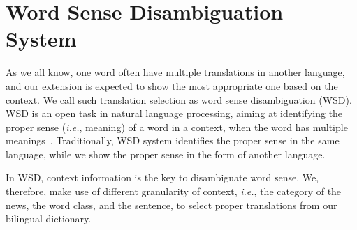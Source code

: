 \section{Word Sense Disambiguation System}
\label{sec:wds}
\begin{CJK}{UTF8}{gbsn}
As we all know, one word often have multiple translations in another language, and our extension is expected to show the most appropriate one based on the context. We call such translation selection as word sense disambiguation (WSD). WSD is an open task in natural language processing, aiming at identifying the proper sense ({\it i.e.}, meaning) of a word  in a context, when the word has multiple meanings~\cite{Navigli2009}. Traditionally, WSD system identifies the proper sense in the same language, while we show the proper sense in the form of another language.

In WSD, context information is the key to disambiguate word sense. We, therefore, make use of different granularity of context, {\it i.e.}, the category of the news, the word class, and the sentence, to select proper translations from our bilingual dictionary.


                                                         

\end{CJK}
